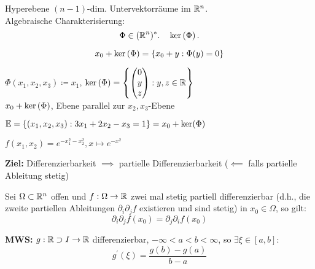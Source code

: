 \begin{subdefinition*}[Hyperebenen]
	Hyperebene $ (n - 1) $-dim. Untervektorräume im $ \mathbb{R} ^n $.\\
	Algebraische Charakterisierung:
	\[
		\Phi \in (\mathbb{R} ^n)^*. \quad \operatorname{ker}\left( \Phi \right) .
	\]
\end{subdefinition*}
\begin{subdefinition*}
	\[
		x_0 + \operatorname{ker}\left( \Phi \right) = \left\{ x_0 + y : \Phi(y) = 0 \right\} 
	\]
	\begin{itemize}
	{\color{gadse-orange}
		\item $ \Phi(x_1, x_2, x_3) \coloneqq x_1 $, $ \operatorname{ker}\left( \Phi \right) = \left\{ \begin{pmatrix} 0 \\ y \\ z \end{pmatrix} : y, z \in \mathbb{R}  \right\} $\\
				$ x_0 + \operatorname{ker}\left( \Phi \right)  $, Ebene parallel zur $ x_2, x_3 $-Ebene
	}
		\item $ \mathbb{E} = \left\{ (x_1, x_2, x_3) : 3x_1 + 2x_2 - x_3 = 1 \right\} = x_0 + \operatorname{ker}(\Phi) $ 
		\item $ f(x_1, x_2) = e^{-x_1^2 - x_2^2}, x \mapsto e^{-x^2}   $
	\end{itemize}
\end{subdefinition*}

\textbf{Ziel:} Differenzierbarkeit $ \implies  $ partielle Differenzierbarkeit ($ \impliedby  $ falls partielle Ableitung stetig)

\setcounter{environmentnumber}{14}
\begin{theorem}[Schwarz]
	Sei $ \Omega \subset \mathbb{R} ^n $ offen und $ f : \Omega \to \mathbb{R}  $ zwei mal stetig partiell differenzierbar (d.h., die zweite partiellen Ableitungen $ \partial_i \partial_j f $ existieren und sind stetig) in $ x_0 \in \Omega $, so gilt:
	\[
		\partial_i \partial_j f(x_0) = \partial_j \partial_i f(x_0)
	\]
\end{theorem}

\textbf{MWS:} $ g : \mathbb{R} \supset I \to \mathbb{R}   $ differenzierbar, $ -\infty < a < b < \infty $, so $ \exists \xi \in [a, b] $:
\[
	g^\prime \left( \xi \right) = \frac{ g(b) - g(a) }{ b - a } 
\]

